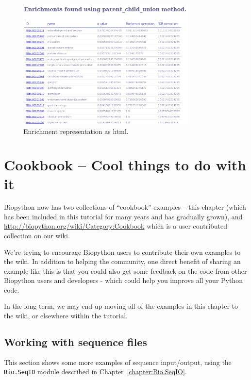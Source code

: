 \documentclass{report}
\begin{document}
\begin{latexonly}
\begin{figure}[htbp]
\centering
\includegraphics[width=0.8\textwidth]{images/pretty_print_html.png}
\caption{Enrichment representation as html.}
\label{fig:prettyhtml}
\end{figure}
\end{latexonly}


\chapter{Cookbook -- Cool things to do with it}
\label{chapter:cookbook}

Biopython now has two collections of ``cookbook'' examples -- this chapter
(which has been included in this tutorial for many years and has gradually
grown), and \url{http://biopython.org/wiki/Category:Cookbook} which is a
user contributed collection on our wiki.

We're trying to encourage Biopython users to contribute their own examples
to the wiki. In addition to helping the community, one direct benefit of
sharing an example like this is that you could also get some feedback on
the code from other Biopython users and developers - which could help you
improve all your Python code.

In the long term, we may end up moving all of the examples in this chapter
to the wiki, or elsewhere within the tutorial.

\section{Working with sequence files}
\label{seq:cookbook-sequences}

This section shows some more examples of sequence input/output, using the
\verb|Bio.SeqIO| module described in Chapter~\ref{chapter:Bio.SeqIO}.
\end{document}
